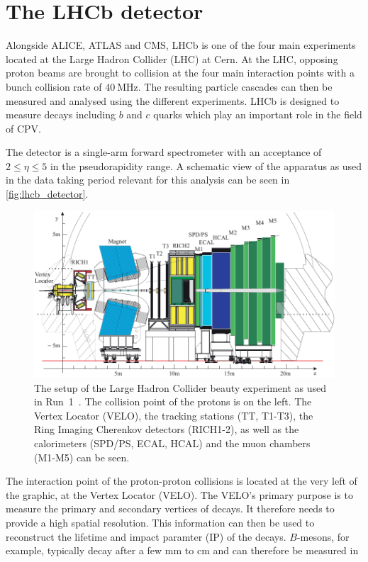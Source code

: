 \section{The LHCb detector}
\label{sec:Detector}
Alongside ALICE, ATLAS and CMS, LHCb is one of the four main experiments located at the Large Hadron Collider (LHC) at Cern. At the LHC, opposing proton beams are brought to
collision at the four main interaction points with a bunch collision rate of $\qty{40}{\mega\hertz}$. The resulting particle cascades can then be measured and analysed using the
different experiments. LHCb is designed to measure decays including $b$ and $c$ quarks which play an important role in the field of CPV. 

The detector is a single-arm forward spectrometer with an acceptance of $2 \leq \eta \leq 5$ in the pseudorapidity range. A schematic view of the apparatus as used in the data taking
period relevant for this analysis can be seen in \autoref{fig:lhcb_detector}.
\begin{figure}
    \centering
    \includegraphics[width = .8\textwidth]{"content/pics/LHCb-Detektor.pdf"}
    \caption{The setup of the Large Hadron Collider beauty experiment as used in Run~1~\cite{LHCb_detector}. 
    The collision point of the protons is on the left. The Vertex Locator (VELO),
    the tracking stations (TT, T1-T3), the Ring Imaging Cherenkov detectors (RICH1-2), as well as the calorimeters (SPD/PS, ECAL, HCAL) and the muon chambers (M1-M5) can be seen.}
    \label{fig:lhcb_detector}
\end{figure}
The interaction point of the proton-proton collisions is located at the very left of the graphic, at the Vertex Locator (VELO). The VELO's primary purpose is to 
measure the primary and secondary vertices of decays. It therefore needs to provide a high spatial resolution. This information can then be used to reconstruct the lifetime and
impact paramter (IP) of the decays. \mbox{$B$-mesons}, for example, typically decay after a few $\unit{\milli\metre}$ to $\unit{\centi\metre}$ and can therefore be measured in 
